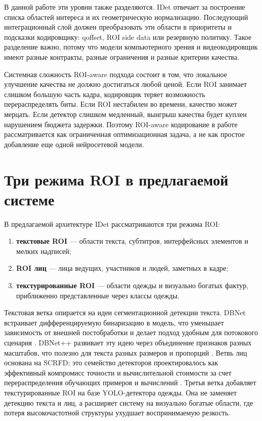 \documentclass[12pt,a4paper,oneside,openany]{report}
\newcommand{\important}[1]{\textbf{#1}}
\begin{document}
В данной работе эти уровни также разделяются. IDet отвечает за построение списка областей
интереса и их геометрическую нормализацию. Последующий интеграционный слой должен преобразовать
эти области в приоритеты и подсказки кодировщику: qoffset, ROI side data или резервную политику.
Такое разделение важно, потому что модели компьютерного зрения и видеокодировщик имеют разные
контракты, разные ограничения и разные критерии качества.

Системная сложность ROI-aware подхода состоит в том, что локальное улучшение качества не должно
достигаться любой ценой. Если ROI занимает слишком большую часть кадра, кодировщик теряет
возможность перераспределять биты. Если ROI нестабилен во времени, качество может мерцать. Если
детектор слишком медленный, выигрыш качества будет куплен нарушением бюджета задержки. Поэтому
ROI-aware кодирование в работе рассматривается как ограниченная оптимизационная задача, а не как
простое добавление еще одной нейросетевой модели.


\section{Три режима ROI в предлагаемой системе}

В предлагаемой архитектуре IDet рассматриваются три режима ROI:
\begin{enumerate}[label=\arabic*)]
  \item \important{текстовые ROI} --- области текста, субтитров, интерфейсных элементов и мелких
      надписей;
  \item \important{ROI лиц} --- лица ведущих, участников и людей, заметных в кадре;
  \item \important{текстурированные ROI} --- области одежды и визуально богатых фактур,
      приближенно представленные через классы одежды.
\end{enumerate}

Текстовая ветка опирается на идеи сегментационной детекции текста. DBNet встраивает
дифференцируемую бинаризацию в модель, что уменьшает зависимость от внешней постобработки и
делает подход удобным для потокового сценария \cite{dbnet}. DBNet++ развивает эту идею через
объединение признаков разных масштабов, что полезно для текста разных размеров и пропорций
\cite{dbnetpp}. Ветвь лиц основана на SCRFD: это семейство детекторов проектировалось как
эффективный компромисс точности и вычислительной стоимости за счет перераспределения обучающих
примеров и вычислений \cite{scrfd}. Третья ветка добавляет текстурированные ROI на базе
YOLO-детектора одежды. Она не заменяет детекцию текста и лиц, а расширяет систему на визуально
богатые области, где потеря высокочастотной структуры ухудшает воспринимаемую резкость.
\end{document}

